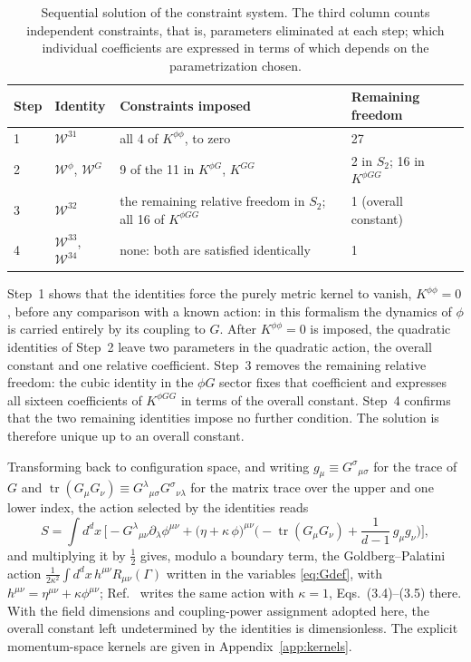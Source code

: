 \documentclass[prd,aps,preprint,superscriptaddress,nofootinbib,amsmath,amssymb,eqsecnum]{revtex4-2}
\newcommand{\W}{\mathcal{W}}
\begin{document}
\begin{table}[htb]
\centering
\begin{tabular}{@{}llll@{}}
\toprule
Step & Identity & Constraints imposed & Remaining freedom \\
\midrule
1 & $\W^{31}$ & all 4 of $K^{\phi\phi}$, to zero & 27 \\
2 & $\W^{\phi}$, $\W^{G}$ & 9 of the 11 in $K^{\phi G}$, $K^{GG}$ & 2 in $S_2$; 16 in $K^{\phi GG}$ \\
3 & $\W^{32}$ & the remaining relative freedom in $S_2$; all 16 of $K^{\phi GG}$ & 1 (overall constant) \\
4 & $\W^{33}$, $\W^{34}$ & none: both are satisfied identically & 1 \\
\bottomrule
\end{tabular}
\caption{Sequential solution of the constraint system. The third column counts
independent constraints, that is, parameters eliminated at each step; which individual
coefficients are expressed in terms of which depends on the parametrization chosen.}
\label{tab:flow}
\end{table}

Step~1 shows that the identities force the purely metric kernel to vanish,
$K^{\phi\phi}=0$, before any comparison with a known action: in this formalism the
dynamics of $\phi$ is carried entirely by its coupling to $G$. After $K^{\phi\phi}=0$ is
imposed, the quadratic identities of Step~2 leave two parameters in the quadratic action,
the overall constant and one relative coefficient. Step~3 removes the remaining relative
freedom: the cubic identity in the $\phi G$ sector fixes that coefficient and expresses all
sixteen coefficients of $K^{\phi GG}$ in terms of the overall constant. Step~4 confirms that
the two remaining identities impose no further condition. The solution is therefore unique up to an overall
constant.

Transforming back to configuration space, and writing $g_\mu\equiv G^{\sigma}{}_{\mu\sigma}$ for
the trace of $G$ and $\operatorname{tr}(G_\mu G_\nu)\equiv G^{\lambda}{}_{\mu\sigma}G^{\sigma}{}_{\nu\lambda}$
for the matrix trace over the upper and one lower index, the action selected by the identities reads
\begin{equation}
S=\int d^dx\,\Big[-G^{\lambda}{}_{\mu\nu}\partial_\lambda\phi^{\mu\nu}
+\big(\eta+\kappa\,\phi\big)^{\mu\nu}
\Big(-\operatorname{tr}(G_\mu G_\nu)+\frac{1}{d-1}\,g_\mu g_\nu\Big)\Big],
\label{eq:result}
\end{equation}
and multiplying it by $\tfrac12$ gives, modulo a boundary term, the Goldberg--Palatini action
$\frac{1}{2\kappa^2}\int d^dx\,h^{\mu\nu}R_{\mu\nu}(\Gamma)$ written in the variables
\eqref{eq:Gdef}, with $h^{\mu\nu}=\eta^{\mu\nu}+\kappa\phi^{\mu\nu}$; Ref.~\cite{BrandtMcKeon2016}
writes the same action with $\kappa=1$, Eqs.~(3.4)--(3.5) there. With the field dimensions
and coupling-power assignment adopted here, the overall constant left undetermined by the
identities is dimensionless.
The explicit momentum-space kernels are given in Appendix~\ref{app:kernels}.
\end{document}
